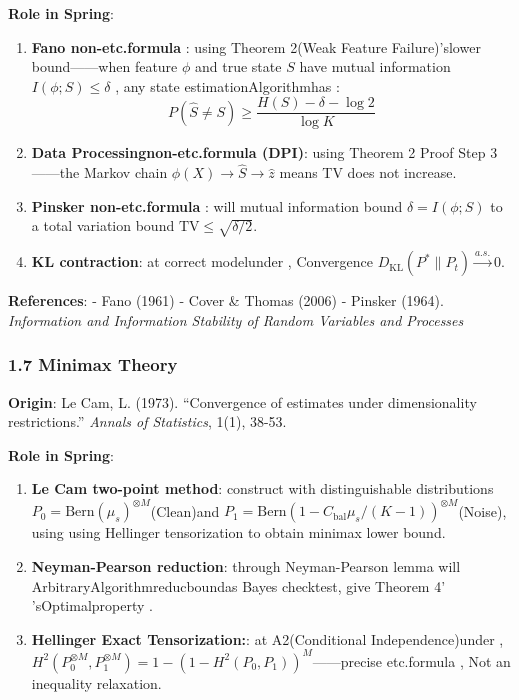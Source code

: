 \documentclass[
  12pt,
]{article}
\begin{document}
\textbf{Role in Spring}:

\begin{enumerate}
\def\labelenumi{\arabic{enumi}.}
\item
  \textbf{Fano non-etc.formula }: using  Theorem 2(Weak Feature Failure)'slower bound------when feature
  \(\phi\) and true state \(S\) have mutual information \(I(\phi; S) \leq \delta\)
  , any state estimationAlgorithmhas : 
  \[P(\hat{S} \neq S) \geq \frac{H(S) - \delta - \log 2}{\log K}\]
\item
  \textbf{Data Processingnon-etc.formula  (DPI)}: using  Theorem 2 Proof Step
  3------the Markov chain \(\phi(X) \to \hat{S} \to \hat{z}\) means  TV
  does not increase.
\item
  \textbf{Pinsker non-etc.formula }: will mutual information bound \(\delta = I(\phi; S)\)
  to a total variation bound \(\text{TV} \leq \sqrt{\delta/2}\). 
\item
  \textbf{KL contraction}: at correct modelunder , Convergence
  \(D_{\text{KL}}(P^* \| P_t) \xrightarrow{a.s.} 0\). 
\end{enumerate}

\textbf{References}: - Fano (1961) - Cover \& Thomas (2006) - Pinsker
(1964). \emph{Information and Information Stability of Random Variables
and Processes}

\subsubsection{1.7 Minimax Theory}\label{minimax-ux7406ux8bba}

\textbf{Origin}: Le Cam, L. (1973). ``Convergence of estimates under
dimensionality restrictions.'' \emph{Annals of Statistics}, 1(1), 38-53.

\textbf{Role in Spring}:

\begin{enumerate}
\def\labelenumi{\arabic{enumi}.}
\item
  \textbf{Le Cam two-point method}: construct with distinguishable distributions
  \(P_0 = \text{Bern}(\mu_s)^{\otimes M}\)(Clean)and 
  \(P_1 = \text{Bern}(1 - C_{\text{bal}}\mu_s/(K-1))^{\otimes M}\)(Noise), using using 
  Hellinger tensorization to obtain  minimax lower bound. 
\item
  \textbf{Neyman-Pearson reduction}: through  Neyman-Pearson lemma will ArbitraryAlgorithmreducboundas 
  Bayes checktest, give  Theorem 4' 'sOptimalproperty . 
\item
  \textbf{Hellinger Exact Tensorization:}: at 
  A2(Conditional Independence)under , \(H^2(P_0^{\otimes M}, P_1^{\otimes M}) = 1 - (1 - H^2(P_0, P_1))^M\)------precise etc.formula , Not an inequality relaxation. 
\end{enumerate}
\end{document}
